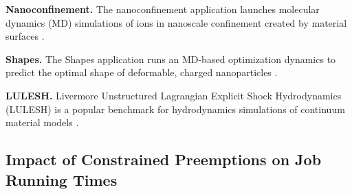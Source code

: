 
\noindent \textbf{Nanoconfinement.}
The nanoconfinement application launches molecular dynamics (MD) simulations of ions in nanoscale confinement created by material surfaces \cite{jing2015ionic,kadupitiya2017}.

\noindent \textbf{Shapes.} The Shapes application runs an MD-based optimization dynamics to predict the optimal shape of deformable, charged nanoparticles \cite{jto1,brunk2019computational}. 

\noindent \textbf{LULESH.} Livermore Unstructured Lagrangian Explicit Shock Hydrodynamics (LULESH)  is a popular benchmark for hydrodynamics simulations of continuum material models \cite{IPDPS13:LULESH,LULESH2:changes}. 





\vspace*{\subsecspace}
\subsection{Impact of Constrained Preemptions on Job Running Times}

